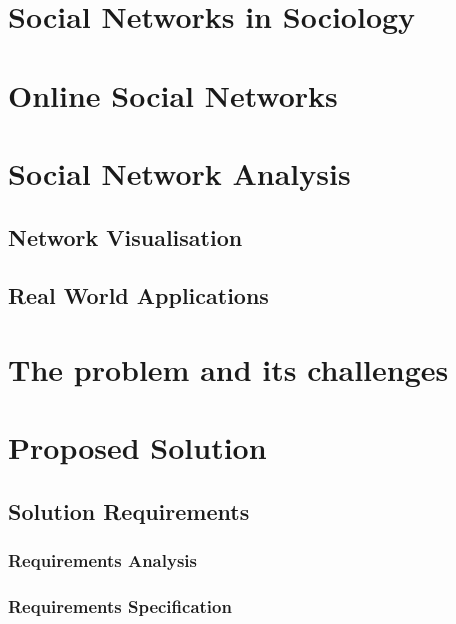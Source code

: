 \documentclass[
  oneside,
  11pt, a4paper,
  footinclude=true,
  headinclude=true,
  cleardoublepage=empty
]{scrbook}
\begin{document}
	
	\chapter{Social Networks in Sociology}
	
	
	
	\chapter{Online Social Networks}
	
	
	
	\chapter{Social Network Analysis}
	
	
	\section{Network Visualisation}
	
	\section{Real World Applications}


	\chapter{The problem and its challenges}


	\chapter{Proposed Solution}
	\section{Solution Requirements}
	\subsection{Requirements Analysis}
	\subsection{Requirements Specification}
\end{document}
